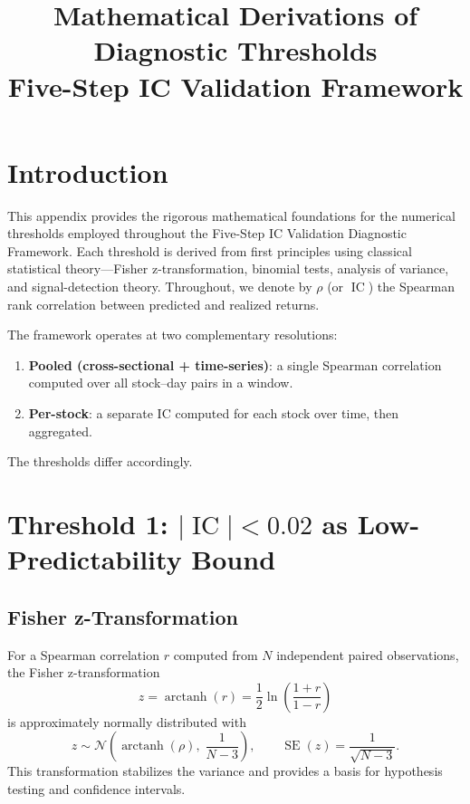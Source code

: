 \documentclass[11pt,a4paper]{article}
\theoremstyle{definition}
\newcommand{\IC}{\operatorname{IC}}
\newcommand{\SE}{\operatorname{SE}}
\newcommand{\arctanh}{\operatorname{arctanh}}
\newcommand{\N}{\mathcal{N}}
\begin{document}
\title{\textbf{Mathematical Derivations of Diagnostic Thresholds}\\
       \large Five-Step IC Validation Framework}
\author{}
\date{}
\maketitle

\section{Introduction}

This appendix provides the rigorous mathematical foundations for the numerical
thresholds employed throughout the Five-Step IC Validation Diagnostic Framework.
Each threshold is derived from first principles using classical statistical
theory---Fisher z-transformation, binomial tests, analysis of variance, and
signal-detection theory. Throughout, we denote by $\rho$ (or $\IC$) the
Spearman rank correlation between predicted and realized returns.

The framework operates at two complementary resolutions:
\begin{enumerate}[nosep]
    \item \textbf{Pooled (cross-sectional + time-series)}: a single Spearman
          correlation computed over all stock--day pairs in a window.
    \item \textbf{Per-stock}: a separate IC computed for each stock over time,
          then aggregated.
\end{enumerate}
The thresholds differ accordingly.

\section{Threshold 1: \texorpdfstring{$|\IC| < 0.02$}{IC < 0.02} as Low-Predictability Bound}

\subsection{Fisher z-Transformation}

For a Spearman correlation $r$ computed from $N$ independent paired
observations, the Fisher z-transformation
\begin{equation}
    z = \arctanh(r) = \frac{1}{2}\ln\!\left(\frac{1+r}{1-r}\right)
    \label{eq:fisher}
\end{equation}
is approximately normally distributed with
\begin{equation}
    z \sim \N\!\left(\arctanh(\rho),\;\frac{1}{N-3}\right),
    \qquad \SE(z) = \frac{1}{\sqrt{N-3}}.
    \label{eq:fisher_se}
\end{equation}
This transformation stabilizes the variance and provides a basis for
hypothesis testing and confidence intervals.
\end{document}
